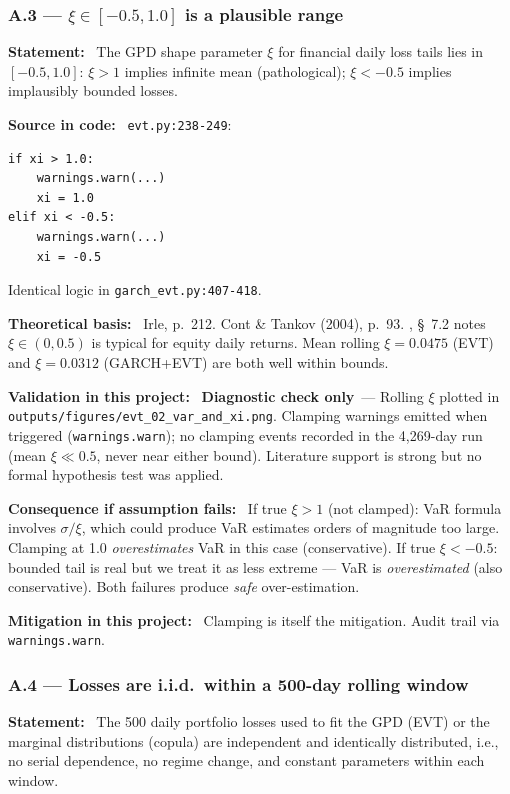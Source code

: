 \documentclass[11pt,a4paper]{article}
\newcommand{\asmfield}[1]{\medskip\noindent\textbf{#1:}\ }
\newcommand{\code}[1]{\texttt{#1}}
\newcommand{\diagnostic}{\textbf{Diagnostic check only}}
\begin{document}
\subsubsection{A.3 --- $\xi \in [-0.5, 1.0]$ is a plausible range}\label{asm:A3}

\asmfield{Statement}
The GPD shape parameter $\xi$ for financial daily loss tails lies in
$[-0.5, 1.0]$: $\xi > 1$ implies infinite mean (pathological);
$\xi < -0.5$ implies implausibly bounded losses.

\asmfield{Source in code}
\code{evt.py:238-249}:
\begin{lstlisting}
if xi > 1.0:
    warnings.warn(...)
    xi = 1.0
elif xi < -0.5:
    warnings.warn(...)
    xi = -0.5
\end{lstlisting}
Identical logic in \code{garch\_evt.py:407-418}.

\asmfield{Theoretical basis}
Irle, p.~212. Cont \& Tankov (2004), p.~93. \cite{McNeilFreyEmbrechts2005},
\S~7.2 notes $\xi \in (0, 0.5)$ is typical for equity daily returns.
Mean rolling $\xi = 0.0475$ (EVT) and $\xi = 0.0312$ (GARCH+EVT) are
both well within bounds.

\asmfield{Validation in this project}
\diagnostic\ --- Rolling $\xi$ plotted in \code{outputs/figures/evt\_02\_var\_and\_xi.png}.
Clamping warnings emitted when triggered (\code{warnings.warn}); no
clamping events recorded in the 4{,}269-day run (mean $\xi \ll 0.5$,
never near either bound). Literature support is strong but no formal
hypothesis test was applied.

\asmfield{Consequence if assumption fails}
If true $\xi > 1$ (not clamped): VaR formula involves $\sigma/\xi$, which
could produce VaR estimates orders of magnitude too large. Clamping at 1.0
\emph{overestimates} VaR in this case (conservative). If true $\xi < -0.5$:
bounded tail is real but we treat it as less extreme --- VaR is
\emph{overestimated} (also conservative). Both failures produce \emph{safe}
over-estimation.

\asmfield{Mitigation in this project}
Clamping is itself the mitigation. Audit trail via \code{warnings.warn}.

\subsubsection{A.4 --- Losses are i.i.d.\ within a 500-day rolling window}\label{asm:A4}

\asmfield{Statement}
The 500 daily portfolio losses used to fit the GPD (EVT) or the marginal
distributions (copula) are independent and identically distributed, i.e.,
no serial dependence, no regime change, and constant parameters within
each window.
\end{document}
